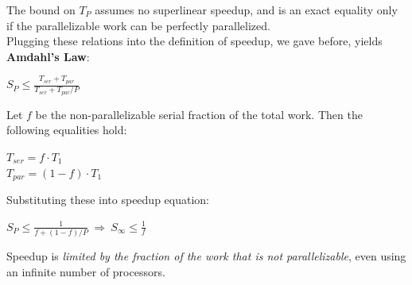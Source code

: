 The bound on \(T_{P}\) assumes no superlinear speedup, and is an exact equality only if the parallelizable work can be perfectly parallelized.\\
Plugging these relations into the definition of speedup, we gave before, yields \textbf{Amdahl’s Law}:
\begin{center}
	\(S_{P} \leq \frac{T_{ser}+T_{par}}{T_{ser}+T_{par}/P}\)
\end{center}
Let \(f\) be the non-parallelizable serial fraction of the total work. Then the following equalities hold:
\begin{center}
	\(T_{ser} = f \cdot T_{1}\)\\
	 \(T_{par} = (1-f) \cdot T_{1}\)
\end{center}

Substituting these into speedup equation:
\begin{center}
	\(S_{P} \leq \frac{1}{f+(1-f)/P}\  \Rightarrow \  S_{\infty} \leq \frac{1}{f}\)
\end{center}

Speedup is \textit{limited by the fraction of the work that is not parallelizable}, even using an infinite number of processors\cite{structparprog}.\\




